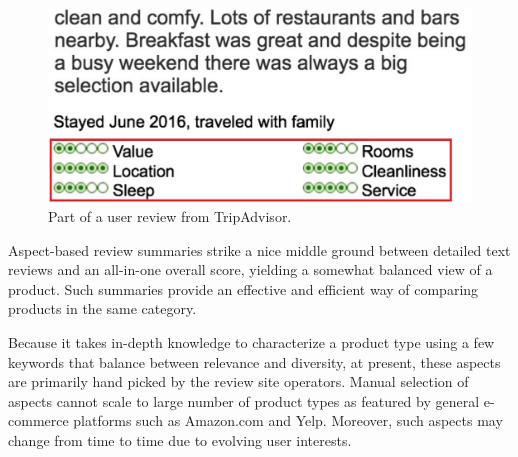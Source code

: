\documentclass[10pt,final,conference,letterpaper]{IEEEtran}
\begin{document}
\begin{figure}[th]
\centering
\includegraphics[width=0.7\columnwidth]{figures/tripadvisor-short}
\caption{Part of a user review from TripAdvisor.}
\label{fig:tripadvisor}
\end{figure}


Aspect-based review summaries strike a nice middle ground between
detailed text reviews and an all-in-one overall score, yielding
a somewhat balanced view of a product. Such summaries
provide an effective and efficient way of comparing products in
the same category.


Because it takes in-depth knowledge to 
characterize a product type using a few keywords that balance between
relevance and diversity, at present, these aspects are primarily hand picked
by the review site operators.
Manual selection of aspects cannot scale to large number of
product types as featured by general e-commerce platforms such as Amazon.com
and Yelp. Moreover, such aspects may change from time to time due to 
evolving user interests.
\end{document}
